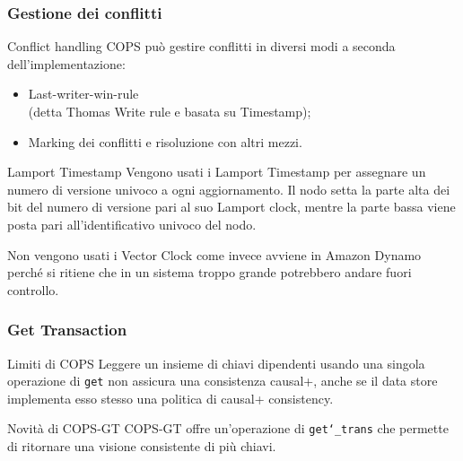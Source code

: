 \begin{frame}
\frametitle{Gestione dei conflitti}
\begin{block}{Conflict handling}
COPS può gestire conflitti in diversi modi a seconda dell'implementazione:
	\begin{itemize}
		\item<1-> Last-writer-win-rule \\
				  (detta Thomas Write rule e basata su Timestamp);
		\item<1-> Marking dei conflitti e risoluzione con altri mezzi.
	\end{itemize}
\end{block}
\begin{block}{Lamport Timestamp}
Vengono usati i Lamport Timestamp per assegnare un numero di versione univoco a ogni aggiornamento.
Il nodo setta la parte alta dei bit del numero di versione pari al suo Lamport clock, mentre la
parte bassa viene posta pari all'identificativo univoco del nodo. \\
\end{block}
Non vengono usati i Vector Clock come invece avviene in Amazon Dynamo perché
si ritiene che in un sistema troppo grande potrebbero andare fuori controllo.
\end{frame}

\begin{frame}
\frametitle{Get Transaction}
\begin{block}{Limiti di COPS}
Leggere un insieme di chiavi dipendenti usando una singola operazione di \texttt{get}
non assicura una consistenza causal+, anche se il data store implementa esso stesso
una politica di causal+ consistency.
\end{block}
\begin{block}{Novità di COPS-GT}
COPS-GT offre un'operazione di \texttt{get\char`_trans} che permette di
ritornare una visione consistente di più chiavi.
\end{block}
\end{frame}

